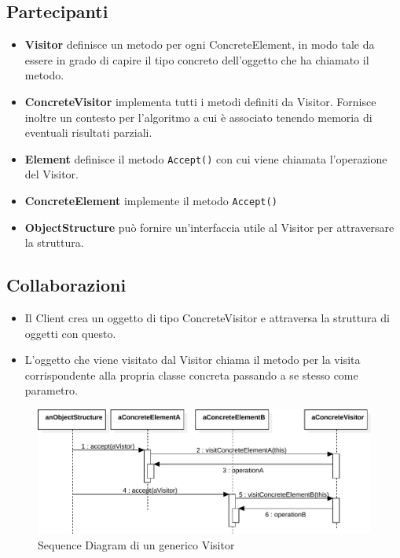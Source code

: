 \subsection{Partecipanti}
\begin{itemize}
\item \textbf{Visitor} definisce un metodo per ogni ConcreteElement, in modo tale da essere in grado di capire il tipo concreto dell'oggetto che ha chiamato il metodo.
\item \textbf{ConcreteVisitor} implementa tutti i metodi definiti da Visitor. Fornisce inoltre un contesto per l'algoritmo a cui è associato tenendo memoria di eventuali risultati parziali.
\item \textbf{Element} definisce il metodo \texttt{Accept()} con cui viene chiamata l'operazione del Visitor.
\item \textbf{ConcreteElement} implemente il metodo \texttt{Accept()}
\item \textbf{ObjectStructure} può fornire un'interfaccia utile al Visitor per attraversare la struttura.
\end{itemize}

\subsection{Collaborazioni}
\begin{itemize}
\item Il Client crea un oggetto di tipo ConcreteVisitor e attraversa la struttura di oggetti con questo.
\item L'oggetto che viene visitato dal Visitor chiama il metodo per la visita corrispondente alla propria classe concreta passando a se stesso come parametro.
\end{itemize}
\begin{figure}[htbp]
\centering
\includegraphics[width=\textwidth,height=\textheight,keepaspectratio]{images/visitor-pattern-sequence.pdf}
\caption{Sequence Diagram di un generico Visitor}
\label{fig:visitor-pattern-sequence}
\end{figure}

